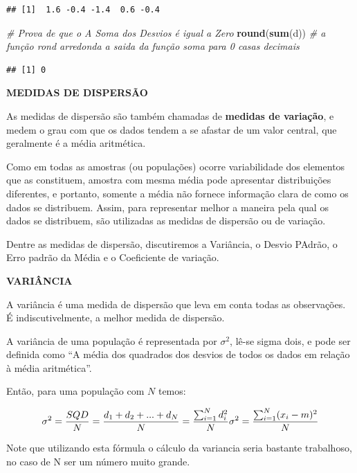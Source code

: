 \documentclass[
]{book}
\newenvironment{Shaded}{\begin{snugshade}}{\end{snugshade}}
\newcommand{\CommentTok}[1]{\textcolor[rgb]{0.56,0.35,0.01}{\textit{#1}}}
\newcommand{\KeywordTok}[1]{\textcolor[rgb]{0.13,0.29,0.53}{\textbf{#1}}}
\newcommand{\NormalTok}[1]{#1}
\begin{document}
\begin{verbatim}
## [1]  1.6 -0.4 -1.4  0.6 -0.4
\end{verbatim}

\begin{Shaded}
\begin{Highlighting}[]
\CommentTok{# Prova de que o A Soma dos Desvios é igual a Zero}
\KeywordTok{round}\NormalTok{(}\KeywordTok{sum}\NormalTok{(d))  }\CommentTok{# a função rond arredonda a saida da função soma para 0 casas decimais}
\end{Highlighting}
\end{Shaded}

\begin{verbatim}
## [1] 0
\end{verbatim}

\textbf{MEDIDAS DE DISPERSÃO}

As medidas de dispersão são também chamadas de \textbf{medidas de variação}, e medem o grau com que os dados tendem a se afastar de um valor central, que geralmente é a média aritmética.

Como em todas as amostras (ou populações) ocorre variabilidade dos elementos que as constituem, amostra com mesma média pode apresentar distribuições diferentes, e portanto, somente a média não fornece informação clara de como os dados se distribuem. Assim, para representar melhor a maneira pela qual os dados se distribuem, são utilizadas as medidas de dispersão ou de variação.

Dentre as medidas de dispersão, discutiremos a Variância, o Desvio PAdrão, o Erro padrão da Média e o Coeficiente de variação.

\textbf{VARIÂNCIA}

A variância é uma medida de dispersão que leva em conta todas as observações. É indiscutivelmente, a melhor medida de dispersão.

A variância de uma população é representada por \(\sigma^2\), lê-se sigma dois, e pode ser definida como ``A média dos quadrados dos desvios de todos os dados em relação à média aritmética''.

Então, para uma população com \(N\) temos:

\[
\sigma^2 = \frac{SQD}{N} = \frac{d_1+d_2+...+d_N}{N} =\frac{\sum_{i=1}^Nd_i^2}{N} \\
\sigma^2 =\frac{\sum_{i=1}^N(x_i-m)^2}{N}
\]

Note que utilizando esta fórmula o cálculo da variancia seria bastante trabalhoso, no caso de N ser um número muito grande.
\end{document}
